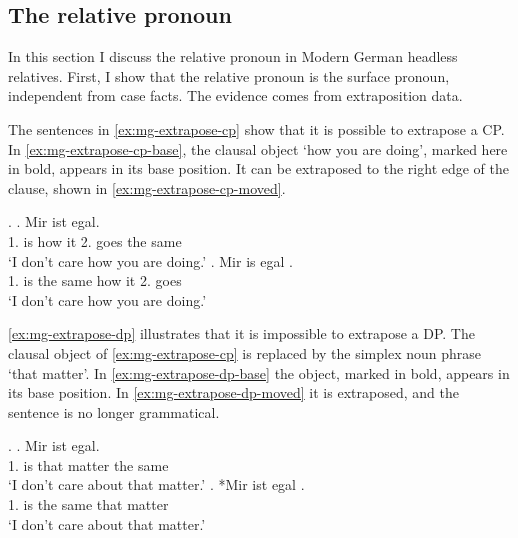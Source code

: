 \subsection{The relative pronoun}

In this section I discuss the relative pronoun in Modern German headless relatives.
First, I show that the relative pronoun is the surface pronoun, independent from case facts. The evidence comes from extraposition data.

The sentences in \ref{ex:mg-extrapose-cp} show that it is possible to extrapose a CP. In \ref{ex:mg-extrapose-cp-base}, the clausal object  `how you are doing', marked here in bold, appears in its base position. It can be extraposed to the right edge of the clause, shown in \ref{ex:mg-extrapose-cp-moved}.

\ex.\label{ex:mg-extrapose-cp}
\ag. Mir ist     egal.\\
1. is how it 2. goes {the same}\\
`I don't care how you are doing.'\label{ex:mg-extrapose-cp-base}
\bg. Mir is egal    .\\
1. is {the same} how it 2. goes\\
`I don't care how you are doing.' \label{ex:mg-extrapose-cp-moved}

\ref{ex:mg-extrapose-dp} illustrates that it is impossible to extrapose a DP. The clausal object of \ref{ex:mg-extrapose-cp} is replaced by the simplex noun phrase  `that matter'.
In \ref{ex:mg-extrapose-dp-base} the object, marked in bold, appears in its base position. In \ref{ex:mg-extrapose-dp-moved} it is extraposed, and the sentence is no longer grammatical.

\ex.\label{ex:mg-extrapose-dp}
\ag. Mir ist   egal.\\
1. is that matter {the same}\\
`I don't care about that matter.'\label{ex:mg-extrapose-dp-base}
\bg. *Mir ist egal  .\\
1. is {the same} that matter\\
`I don't care about that matter.' \label{ex:mg-extrapose-dp-moved}

